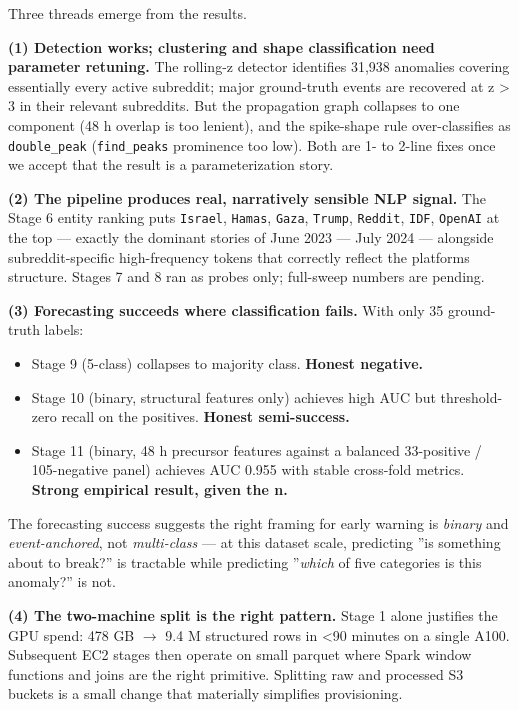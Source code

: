 \documentclass[
]{article}
\begin{document}
Three threads emerge from the results.

\textbf{(1) Detection works; clustering and shape classification need
parameter retuning.} The rolling-z detector identifies 31,938 anomalies
covering essentially every active subreddit; major ground-truth events
are recovered at z \textgreater{} 3 in their relevant subreddits. But
the propagation graph collapses to one component (48 h overlap is too
lenient), and the spike-shape rule over-classifies as
\texttt{double\_peak} (\texttt{find\_peaks} prominence too low). Both
are 1- to 2-line fixes once we accept that the result is a
parameterization story.

\textbf{(2) The pipeline produces real, narratively sensible NLP
signal.} The Stage 6 entity ranking puts \texttt{Israel},
\texttt{Hamas}, \texttt{Gaza}, \texttt{Trump}, \texttt{Reddit},
\texttt{IDF}, \texttt{OpenAI} at the top --- exactly the dominant
stories of June 2023 --- July 2024 --- alongside subreddit-specific
high-frequency tokens that correctly reflect the
platform\textquotesingle s structure. Stages 7 and 8 ran as probes only;
full-sweep numbers are pending.

\textbf{(3) Forecasting succeeds where classification fails.} With only
35 ground-truth labels:

\begin{itemize}
\item
  Stage 9 (5-class) collapses to majority class. \textbf{Honest
  negative.}
\item
  Stage 10 (binary, structural features only) achieves high AUC but
  threshold-zero recall on the positives. \textbf{Honest semi-success.}
\item
  Stage 11 (binary, 48 h precursor features against a balanced
  33-positive / 105-negative panel) achieves AUC 0.955 with stable
  cross-fold metrics. \textbf{Strong empirical result, given the n.}
\end{itemize}

The forecasting success suggests the right framing for early warning is
\emph{binary} and \emph{event-anchored}, not \emph{multi-class} --- at
this dataset scale, predicting ''is something about to break?'' is
tractable while predicting ''\emph{which} of five categories is this
anomaly?'' is not.

\textbf{(4) The two-machine split is the right pattern.} Stage 1 alone
justifies the GPU spend: 478 GB $\rightarrow$ 9.4 M structured rows in \textless90
minutes on a single A100. Subsequent EC2 stages then operate on small
parquet where Spark window functions and joins are the right primitive.
Splitting raw and processed S3 buckets is a small change
that materially simplifies provisioning.
\end{document}
